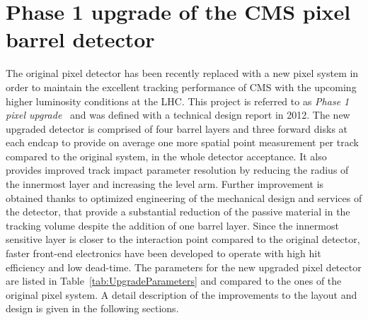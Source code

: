 \chapter{Phase 1 upgrade of the CMS pixel barrel detector}
\label{ch:Phase1Intro}

The original pixel detector has been recently replaced with a new pixel system in order to maintain the excellent tracking performance of CMS with the upcoming higher luminosity conditions at the LHC.
This project is referred to as \textit{Phase 1 pixel upgrade}~\cite{Dominguez:1481838} and was defined with a technical design report in 2012. The new upgraded detector is comprised of four barrel layers and three forward disks at each endcap to provide on average one more spatial point measurement per track compared to the original system, in the whole detector acceptance. It also provides improved track impact parameter resolution by reducing the radius of the innermost layer and increasing the level arm. 
Further improvement is obtained thanks to optimized engineering of the mechanical design and services of the detector, that provide a substantial reduction of the passive material in the tracking volume despite the addition of one barrel layer. Since the innermost sensitive layer is closer to the interaction point compared to the original detector, faster front-end electronics have been developed to operate with high hit efficiency and low dead-time.
The parameters for the new upgraded pixel detector are listed in Table~\ref{tab:UpgradeParameters} and compared to the ones of the original pixel system.
A detail description of the improvements to the layout and design is given in the following sections.\\

